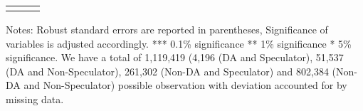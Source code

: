 \begin{table}[!p]
{\begin{threeparttable}
\begin{tabular}{@{\extracolsep{5pt}}lD{.}{.}{-3} D{.}{.}{-3} }
\bottomrule \\[-1.8ex] 


\end{tabular} 

\begin{tablenotes}
  \LARGE
      Notes: Robust standard errors are reported in parentheses, Significance of variables is adjusted accordingly. *** 0.1\% significance ** 1\% significance * 5\% significance. We have a total of 1,119,419 (4,196 (DA and Speculator), 51,537 (DA and Non-Speculator), 261,302 (Non-DA and Speculator) and 802,384 (Non-DA and Non-Speculator) possible observation with deviation accounted for by missing data.
\end{tablenotes}    



\end{threeparttable}
}
\end{table} 